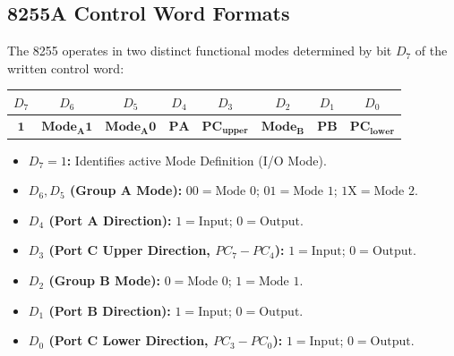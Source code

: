 \documentclass[12pt,a4paper]{article}
\begin{document}
\subsection{8255A Control Word Formats}
The 8255 operates in two distinct functional modes determined by bit $D_7$ of the written control word:
\begin{tcolorbox}[formulabox, title={8255A I/O Mode Control Word ($D_7 = 1$)}]
\centering
\begin{tabular}{|c|c|c|c|c|c|c|c|}
\hline
\textbf{$D_7$} & \textbf{$D_6$} & \textbf{$D_5$} & \textbf{$D_4$} & \textbf{$D_3$} & \textbf{$D_2$} & \textbf{$D_1$} & \textbf{$D_0$} \\ \hline
$\mathbf{1}$ & $\mathbf{Mode_A1}$ & $\mathbf{Mode_A0}$ & $\mathbf{PA}$ & $\mathbf{PC_{upper}}$ & $\mathbf{Mode_B}$ & $\mathbf{PB}$ & $\mathbf{PC_{lower}}$ \\ \hline
\end{tabular}
\par\vspace{4pt}\raggedright
\begin{itemize}[leftmargin=*, itemsep=2pt]
  \item \textbf{$D_7 = 1$:} Identifies active Mode Definition (I/O Mode).
  \item \textbf{$D_6, D_5$ (Group A Mode):} $00 = \text{Mode 0}$; $01 = \text{Mode 1}$; $1\mathrm{X} = \text{Mode 2}$.
  \item \textbf{$D_4$ (Port A Direction):} $1 = \text{Input}$; $0 = \text{Output}$.
  \item \textbf{$D_3$ (Port C Upper Direction, $PC_7-PC_4$):} $1 = \text{Input}$; $0 = \text{Output}$.
  \item \textbf{$D_2$ (Group B Mode):} $0 = \text{Mode 0}$; $1 = \text{Mode 1}$.
  \item \textbf{$D_1$ (Port B Direction):} $1 = \text{Input}$; $0 = \text{Output}$.
  \item \textbf{$D_0$ (Port C Lower Direction, $PC_3-PC_0$):} $1 = \text{Input}$; $0 = \text{Output}$.
\end{itemize}
\end{tcolorbox}
\end{document}
